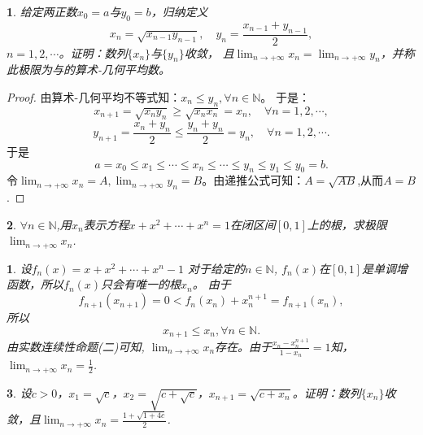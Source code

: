\documentclass[utf8]{book}
\newtheorem{example}{}[section]             %
\newtheorem{solution}{}
\begin{document}
\begin{example}
给定两正数$x_0=a$与$y_0=b$，归纳定义$$x_n=\sqrt{x_{n-1}y_{n-1}}, \quad y_n=\frac{x_{n-1}+y_{n-1}}{2},$$ $n=1,2,\cdots$。证明：数列$\{x_n\}$与$\{y_n\}$收敛，
且$\displaystyle \lim_{n\to +\infty}x_n=\displaystyle \lim_{n\to +\infty}y_n$，并称此极限为与的算术-几何平均数。
\end{example}
\begin{proof}
由算术-几何平均不等式知：$x_n \leq y_n, \forall n\in\mathbb{N}$。
于是：
$$x_{n+1} = \sqrt{x_{n}y_{n}} \geq \sqrt{x_{n}x_{n}} = x_n,\quad\forall n = 1,2,\cdots,$$
$$y_{n+1} = \frac{x_{n}+y_{n}}{2} \leq \frac{y_{n}+y_{n}}{2} = y_n, \quad\forall n = 1,2,\cdots.$$
于是$$a = x_0 \leq x_1 \leq \cdots \leq x_n \leq\cdots \leq y_n \leq y_1 \leq y_0 = b.$$
令$\displaystyle \lim_{n\to +\infty}x_n=A, \displaystyle \lim_{n\to +\infty}y_n=B$。由递推公式可知：$A=\sqrt{AB}$,从而$A = B$.
\end{proof}
\begin{example}
$\forall n\in\mathbb{N}$,用$x_n$表示方程$x+x^2+\cdots+x^n=1$在闭区间$[0,1]$上的根，求极限$\displaystyle \lim_{n\to +\infty}x_n$.
\end{example}
\begin{solution}
设$f_n(x) = x+x^2+\cdots+x^n -1$
对于给定的$n\in \mathbb{N}$, $f_n(x)$在$[0,1]$是单调增函数，所以$f_n(x)$只会有唯一的根$x_n$。
由于$$f_{n+1}(x_{n+1}) = 0 < f_{n}(x_n) + x_n^{n+1} = f_{n+1}(x_n),$$
所以$$x_{n+1} \leq x_n,\forall n\in\mathbb{N}.$$
由实数连续性命题(二)可知, $\displaystyle \lim_{n\to +\infty}x_n$存在。由于$\displaystyle\frac{x_n-x_n^{n+1}}{1-x_n} = 1$知，
$\displaystyle \lim_{n\to +\infty}x_n=\frac{1}{2}$.
\end{solution}
\begin{example}
设$c> 0$，$x_1=\sqrt{c}$，$\displaystyle x_2=\sqrt{c+\sqrt{c}}$，$x_{n+1}=\sqrt{c+x_n}$。证明：数列$\{x_n\}$收敛，且$\displaystyle \lim_{n\to +\infty}x_n=\frac{1+\sqrt{1+4c}}{2}$.
\end{example}
\end{document}
